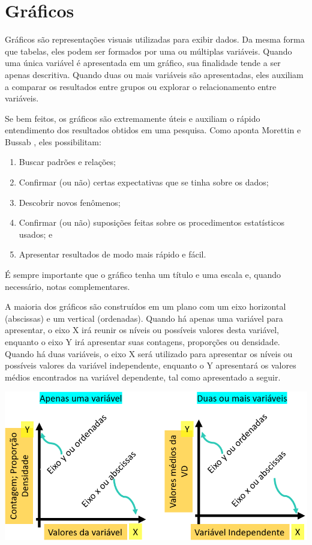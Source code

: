 \documentclass[
]{book}
\providecommand{\tightlist}{%
  \setlength{\itemsep}{0pt}\setlength{\parskip}{0pt}}
\begin{document}
\hypertarget{gruxe1ficos}{%
\section{Gráficos}\label{gruxe1ficos}}

Gráficos são representações visuais utilizadas para exibir dados. Da mesma forma que tabelas, eles podem ser formados por uma ou múltiplas variáveis. Quando uma única variável é apresentada em um gráfico, sua finalidade tende a ser apenas descritiva. Quando duas ou mais variáveis são apresentadas, eles auxiliam a comparar os resultados entre grupos ou explorar o relacionamento entre variáveis.

Se bem feitos, os gráficos são extremamente úteis e auxiliam o rápido entendimento dos resultados obtidos em uma pesquisa. Como aponta Morettin e Bussab \citeyearpar{morettin_bussab_2010}, eles possibilitam:

\begin{enumerate}
\def\labelenumi{(\alph{enumi})}
\tightlist
\item
  Buscar padrões e relações;\\
\item
  Confirmar (ou não) certas expectativas que se tinha sobre os dados;\\
\item
  Descobrir novos fenômenos;\\
\item
  Confirmar (ou não) suposições feitas sobre os procedimentos estatísticos usados; e\\
\item
  Apresentar resultados de modo mais rápido e fácil.
\end{enumerate}

É sempre importante que o gráfico tenha um título e uma escala e, quando necessário, notas complementares.

A maioria dos gráficos são construídos em um plano com um eixo horizontal (abscissas) e um vertical (ordenadas). Quando há apenas uma variável para apresentar, o eixo X irá reunir os níveis ou possíveis valores desta variável, enquanto o eixo Y irá apresentar suas contagens, proporções ou densidade. Quando há duas variáveis, o eixo X será utilizado para apresentar os níveis ou possíveis valores da variável independente, enquanto o Y apresentará os valores médios encontrados na variável dependente, tal como apresentado a seguir.

\includegraphics{./img/cap_grafico_tutorial.png}
\end{document}

